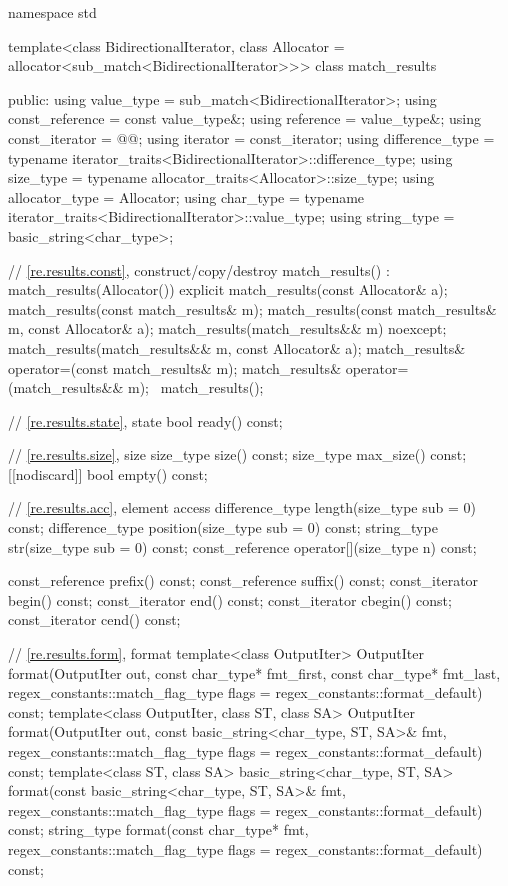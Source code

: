 \begin{codeblock}
namespace std {
  template<class BidirectionalIterator,
           class Allocator = allocator<sub_match<BidirectionalIterator>>>
    class match_results {
    public:
      using value_type      = sub_match<BidirectionalIterator>;
      using const_reference = const value_type&;
      using reference       = value_type&;
      using const_iterator  = @@;
      using iterator        = const_iterator;
      using difference_type =
              typename iterator_traits<BidirectionalIterator>::difference_type;
      using size_type       = typename allocator_traits<Allocator>::size_type;
      using allocator_type  = Allocator;
      using char_type       =
              typename iterator_traits<BidirectionalIterator>::value_type;
      using string_type     = basic_string<char_type>;

      // \ref{re.results.const}, construct/copy/destroy
      match_results() : match_results(Allocator()) {}
      explicit match_results(const Allocator& a);
      match_results(const match_results& m);
      match_results(const match_results& m, const Allocator& a);
      match_results(match_results&& m) noexcept;
      match_results(match_results&& m, const Allocator& a);
      match_results& operator=(const match_results& m);
      match_results& operator=(match_results&& m);
      ~match_results();

      // \ref{re.results.state}, state
      bool ready() const;

      // \ref{re.results.size}, size
      size_type size() const;
      size_type max_size() const;
      [[nodiscard]] bool empty() const;

      // \ref{re.results.acc}, element access
      difference_type length(size_type sub = 0) const;
      difference_type position(size_type sub = 0) const;
      string_type str(size_type sub = 0) const;
      const_reference operator[](size_type n) const;

      const_reference prefix() const;
      const_reference suffix() const;
      const_iterator begin() const;
      const_iterator end() const;
      const_iterator cbegin() const;
      const_iterator cend() const;

      // \ref{re.results.form}, format
      template<class OutputIter>
        OutputIter
          format(OutputIter out,
                 const char_type* fmt_first, const char_type* fmt_last,
                 regex_constants::match_flag_type flags = regex_constants::format_default) const;
      template<class OutputIter, class ST, class SA>
        OutputIter
          format(OutputIter out,
                 const basic_string<char_type, ST, SA>& fmt,
                 regex_constants::match_flag_type flags = regex_constants::format_default) const;
      template<class ST, class SA>
        basic_string<char_type, ST, SA>
          format(const basic_string<char_type, ST, SA>& fmt,
                 regex_constants::match_flag_type flags = regex_constants::format_default) const;
      string_type
        format(const char_type* fmt,
               regex_constants::match_flag_type flags = regex_constants::format_default) const;

}}
\end{codeblock}
